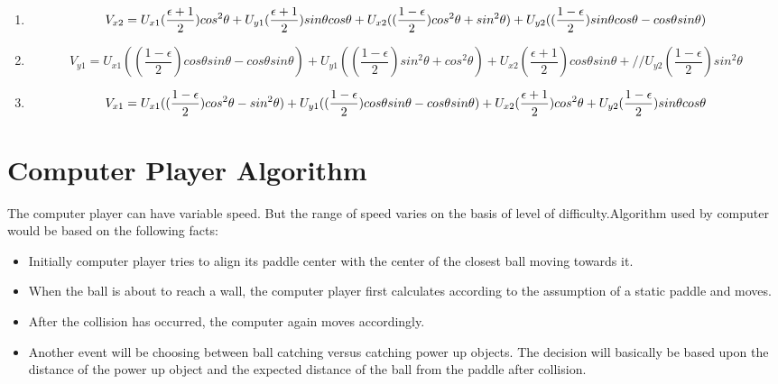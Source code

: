 \documentclass{article}
\begin{document}
\begin{itemize}
\begin{enumerate}
				\item \[V_{x2} = U_{x1}(\frac{\epsilon + 1}{2})cos^2\theta + U_{y1}(\frac{\epsilon + 1}{2})sin\theta cos\theta + U_{x2}((\frac{1 - \epsilon}{2})cos^2\theta + sin^2\theta) + \\ U_{y2}((\frac{1 - \epsilon}{2})sin\theta cos\theta - cos\theta sin\theta) \]
				\item \[ V_{y1} = U_{x1}((\frac{1 - \epsilon}{2})cos\theta sin\theta - cos\theta sin\theta) + U_{y1}((\frac{1 - \epsilon}{2})sin^2\theta + cos^2\theta) + U_{x2}(\frac{\epsilon + 1}{2})cos\theta sin\theta + // U_{y2}(\frac{1 - \epsilon}{2})sin^2\theta \]
				\item \[ V_{x1} = U_{x1}((\frac{1 - \epsilon}{2})cos^2\theta - sin^2\theta) + U_{y1}((\frac{1 - \epsilon}{2})cos\theta sin\theta - cos\theta sin\theta) + U_{x2}(\frac{\epsilon + 1}{2})cos^2\theta + \\ U_{y2}(\frac{1 - \epsilon}{2})sin\theta cos\theta \]

				\end{enumerate}

			\end{itemize}
			

			\section{Computer Player Algorithm}
			\par\noindent The computer player can have variable speed. But the range of speed varies on the basis of level of difficulty.Algorithm used by computer would be based on the following facts:

			\begin{itemize}
			\item Initially computer player tries to align its paddle center with the center of the closest ball moving towards it.
			\item When the ball is about to reach a wall, the computer player first calculates according to the assumption of a static paddle and moves.
			\item After the collision has occurred, the computer again moves accordingly.
			\item Another event will be choosing between ball catching versus catching power up objects. The decision will basically be based upon the distance of the power up object and the expected distance of the ball from the paddle after collision.
			\end{itemize}
\end{document}
